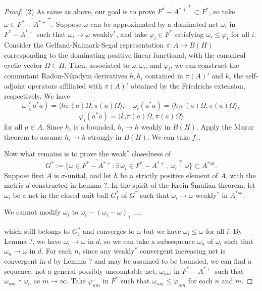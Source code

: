 \documentclass[a4paper]{amsart}
\newcommand{\e}{\varepsilon}
\theoremstyle{plain}
\theoremstyle{definition}
\begin{document}
\begin{proof}
(2)
As same as above, our goal is to prove $\overline{F^*-A^{*+}}^+\subset F^*$, so take $\omega\in\overline{F^*-A^{*+}}^+$.
Suppose $\omega$ can be approximated by a dominated net $\omega_i$ in $F^*-A^{*+}$ such that $\omega_i\to\omega$ weakly$^*$, and take $\varphi_i\in F^*$ satisfying $\omega_i\le\varphi_i$ for all $i$.
Consider the Gelfand-Naimark-Segal representation $\pi:A\to B(H)$ corresponding to the dominating positive linear functional, with the canonical cyclic vector $\Omega\in H$.
Then, associated to $\omega,\omega_i$, and $\varphi_i$, we can construct the commutant Radon-Nikodym derivatives $h,h_i$ contained in $\pi(A)'$ and $k_i$ the self-adjoint operators affiliated with $\pi(A)'$ obtained by the Friedrichs extension, respectively.
We have
\[\omega(a^*a)=\langle h\pi(a)\Omega,\pi(a)\Omega\rangle,\quad\omega_i(a^*a)=\langle h_i\pi(a)\Omega,\pi(a)\Omega\rangle,\]
\[\varphi_i(a^*a)=\langle k_i\pi(a)\Omega,\pi(a)\Omega\rangle\]
for all $a\in A$.
Since $h_i$ is a bounded, $h_i\to h$ weakly in $B(H)$.
Apply the Mazur theorem to assume $h_i\to h$ strongly in $B(H)$.
We can take $f_\e$.



Now what remains is to prove the weak$^*$ closedness of
\[G^*:=\{\omega\in\overline{F^*-A^{*+}}:\exists\,\omega_i\in F^*-A^{*+},\ \omega_i\uparrow\omega\}\subset A^{*sa}.\]
Suppose first $A$ is $\sigma$-unital, and let $h$ be a strictly positive element of $A$, with the metric $d$ constructed in Lemma ?.
In the spirit of the Krein-\v Smulian theorem, let $\omega_i$ be a net in the closed unit ball $G^*_1$ of $G^*$ such that $\omega_i\to\omega$ weakly$^*$ in $A^{*sa}$.









We cannot modify $\omega_i$ to $\omega_i-(\omega_i-\omega)_+$.....

which still belongs to $G^*_1$ and converges to $\omega$ but we have $\omega_i\le\omega$ for all $i$.
By Lemma ?, we have $\omega_i\to\omega$ in $d$, so we can take a subsequence $\omega_n$ of $\omega_i$ such that $\omega_n\to\omega$ in $d$.
For each $n$, since any weakly$^*$ convergent increasing net is convergent in $d$ by Lemma ? and may be assumed to be bounded, we can find a sequence, not a general possibly uncountable net, $\omega_{nm}$ in $F^*-A^{*+}$ such that $\omega_{nm}\uparrow\omega_n$ as $m\to\infty$.
Take $\varphi_{nm}$ in $F^*$ such that $\omega_{nm}\le\varphi_{nm}$ for each $n$ and $m$.


\end{proof}
\end{document}
